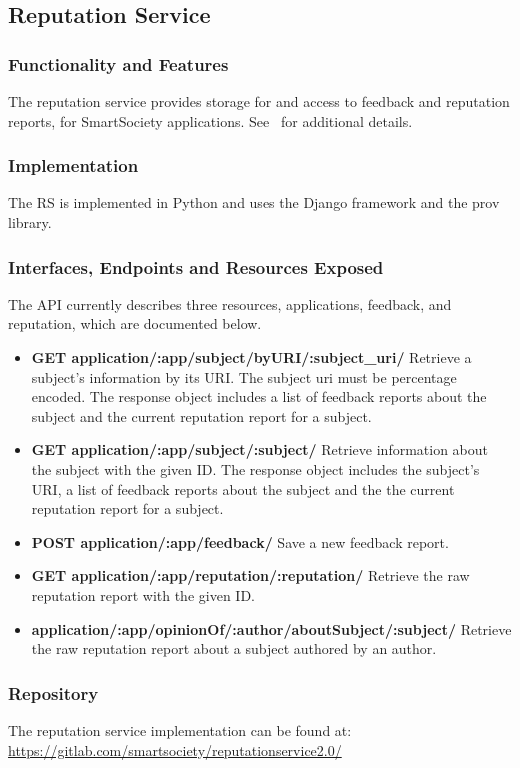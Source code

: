 \subsection{Reputation Service}
\subsubsection{Functionality and Features}
The reputation service provides storage for and access to feedback and reputation reports, for SmartSociety applications. See~\cite{D2.4} for additional details.
\subsubsection{Implementation}
The RS is implemented in Python and uses the Django framework and the prov library.
\subsubsection{Interfaces, Endpoints and Resources Exposed}
The API currently describes three resources, applications, feedback, and reputation, which are documented below. 
\begin{itemize}
\item {\bf GET application/:app/subject/byURI/:subject\_uri/} Retrieve a subject’s information by its URI. The subject uri must be percentage encoded. The response object includes a list of feedback reports about the subject and the current reputation report for a subject.
\item {\bf GET application/:app/subject/:subject/} Retrieve information about the subject with the given ID. The response object includes the subject’s URI, a list of feedback reports about the subject and the the current reputation report for a subject.
\item {\bf POST application/:app/feedback/} Save a new feedback report. 
\item {\bf GET application/:app/reputation/:reputation/} Retrieve the raw reputation report with the given ID.
\item {\bf application/:app/opinionOf/:author/aboutSubject/:subject/} Retrieve the raw reputation report about a subject authored by an author.
\end{itemize}

\subsubsection{Repository}
The reputation service implementation can be found at: \url{https://gitlab.com/smartsociety/reputationservice2.0/}